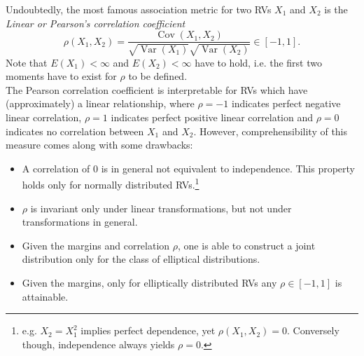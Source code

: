 
Undoubtedly, the most famous association metric for two \acp{RV} $X_1$ and $X_2$ is the \textit{Linear or Pearson's correlation coefficient}
\begin{equation}
\rho\left(X_{1}, X_{2}\right)=
\frac{\operatorname{Cov}\left(X_{1}, X_{2}\right)}{\sqrt{\operatorname{Var} (X_{1})} \sqrt{\operatorname{Var} (X_{2})}}
\in [-1, 1].
\label{eq:pearsons_rho}
\end{equation}
Note that $E(X_1) < \infty$ and $E(X_2) < \infty$ have to hold, i.e. the first two moments have to exist for $\rho$ to be defined.\\
The Pearson correlation coefficient is interpretable for \acp{RV} which have (approximately) a linear relationship, where $\rho = -1$ indicates perfect negative linear correlation, $\rho=1$ indicates perfect positive linear correlation and $\rho=0$ indicates no correlation between $X_1$ and $X_2$. However, comprehensibility of this measure comes along with some drawbacks:
\begin{itemize}
\item A correlation of $0$ is in general not equivalent to independence. This property holds only for normally distributed \acp{RV}.\footnote{e.g. $X_2 =X_1^2$ implies perfect dependence, yet $\rho(X_1,X_2) = 0$. Conversely though, independence always yields $\rho=0$.}
\item $\rho$ is invariant only under linear transformations, but not under transformations in general.
\item Given the margins and correlation $\rho$, one is able to construct a joint distribution only for the class of elliptical distributions. 
\item Given the margins, only for elliptically distributed \acp{RV} any $\rho \in [-1,1]$ is attainable.
\end{itemize}








